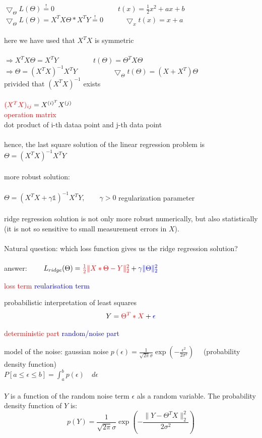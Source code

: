 $\bigtriangledown_{\Theta} L(\Theta) \stackrel{!}{=} 0 \quad\quad\quad\quad\quad\quad\quad\quad\quad  t(x) = \frac{1}{2}x^2+ax+b$\\
$\bigtriangledown_{\Theta} L(\Theta) = X^T X \Theta * X^T Y \stackrel{!}{=} 0  \quad\quad\quad \bigtriangledown_x t(x) = x+a$\\\\
here we have used that $X^T X$ is symmetric\\\\
$\Rightarrow X^T X \Theta = X^T Y \quad\quad\quad\quad\quad t(\Theta) = \Theta^T X \Theta$\\
$\Rightarrow  \Theta = (X^T X)^{-1} X^T Y \quad\quad\quad\quad\quad \bigtriangledown_{\Theta} t(\Theta) = (X+X^T)\Theta$\\
privided that $(X^T X)^{-1}$ exists\\\\
$\textcolor{red}{(X^T X)_{ij}} = X^{(i)^T}X^{(j)}$\\
\textcolor{red}{operation matrix}\\
dot product of i-th dataa point and j-th data point\\\\
hence, the last square solution of the linear regression problem is $\Theta = (X^T X)^{-1} X^T Y$\\\\
more robust solution:\\\\
$\Theta = (X^T X + \gamma \mathds{1})^{-1} X^T Y, \quad\quad \gamma > 0$ regularization parameter\\\\
ridge regression solution is not only more robust numerically, but also statistically (it is not so sensitive to small measurement errors in $X$).\\\\
Natural question: which loss function gives us the ridge regression solution?\\\\
answer: $\quad\quad L_{ridge} (\Theta)= \textcolor{red}{\frac{1}{2} \lVert X * \Theta - Y \lVert_2^2} + \textcolor{blue}{\gamma \lVert \Theta \lVert_2^2}$
\begin{center}
\textcolor{red}{loss term} \space\space \textcolor{blue}{reularisation term}
\end{center}
probabilistic interpretation of least squares
\[ Y = \textcolor{red}{\Theta^T * X} + \textcolor{blue}{\epsilon} \]
\begin{center}
\textcolor{red}{deterministic part} \space\space \textcolor{blue}{random/noise part}
\end{center}
model of the noise: gaussian noise \space\space $p(\epsilon)= \frac{1}{\sqrt{2\pi}\sigma} \exp (- \frac{\epsilon^2}{2 \sigma^2}) \quad$ (probability density function)\\
$P[a \leq \epsilon \leq b] = \int_a^b p(\epsilon)\quad d\epsilon$\\\\
$Y$ is a function of the random noise term $\epsilon$ als a random variable. The probability density function of $Y$ is:
\[ p(Y) = \frac{1}{\sqrt{2 \pi}\sigma} \exp(- \frac{\lVert Y - \Theta^T X \lVert^2_2}{2 \sigma^2})\]
